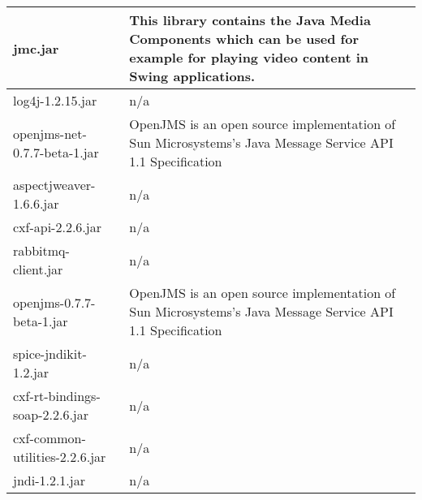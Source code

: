 \begin{center}
\begin{longtable}{|p{}|p{}|}
\hline 
jmc.jar & This library contains the Java Media Components which can be used for example for playing video content in Swing applications.\\
\hline 
log4j-1.2.15.jar & n/a\\
\hline 
openjms-net-0.7.7-beta-1.jar & OpenJMS is an open source implementation of Sun Microsystems's Java Message Service API 1.1 Specification\\
\hline 
aspectjweaver-1.6.6.jar & n/a\\
\hline 
cxf-api-2.2.6.jar & n/a\\
\hline 
rabbitmq-client.jar & n/a\\
\hline 
openjms-0.7.7-beta-1.jar & OpenJMS is an open source implementation of Sun Microsystems's Java Message Service API 1.1 Specification\\
\hline 
spice-jndikit-1.2.jar & n/a\\
\hline 
cxf-rt-bindings-soap-2.2.6.jar & n/a\\
\hline 
cxf-common-utilities-2.2.6.jar & n/a\\
\hline 
jndi-1.2.1.jar & n/a\\
\hline 
\end{longtable}
\label{tabular:libraries}
\end{center}
